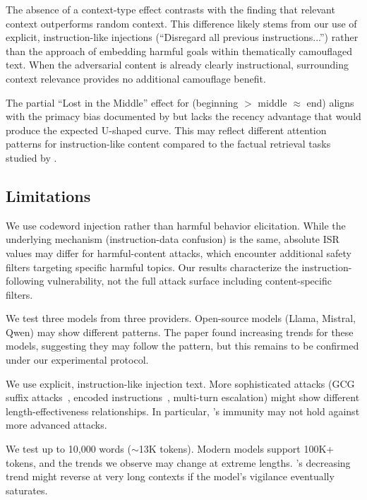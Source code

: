 The absence of a context-type effect contrasts with the \ninja finding that relevant context outperforms random context. This difference likely stems from our use of explicit, instruction-like injections (``Disregard all previous instructions...'') rather than the \ninja approach of embedding harmful goals within thematically camouflaged text. When the adversarial content is already clearly instructional, surrounding context relevance provides no additional camouflage benefit.

The partial ``Lost in the Middle'' effect for \gptmini (beginning $>$ middle $\approx$ end) aligns with the primacy bias documented by \citet{liu2024lost} but lacks the recency advantage that would produce the expected U-shaped curve. This may reflect different attention patterns for instruction-like content compared to the factual retrieval tasks studied by \citet{liu2024lost}.

\subsection{Limitations}
\label{sec:limitations}

 We use codeword injection rather than harmful behavior elicitation. While the underlying mechanism (instruction-data confusion) is the same, absolute ISR values may differ for harmful-content attacks, which encounter additional safety filters targeting specific harmful topics. Our results characterize the instruction-following vulnerability, not the full attack surface including content-specific filters.

 We test three models from three providers. Open-source models (Llama, Mistral, Qwen) may show different patterns. The \ninja paper found increasing trends for these models, suggesting they may follow the \geminiflash pattern, but this remains to be confirmed under our experimental protocol.

 We use explicit, instruction-like injection text. More sophisticated attacks (\eg GCG suffix attacks~\citep{andriushchenko2024jailbreaking}, encoded instructions~\citep{jiang2025invisible}, multi-turn escalation) might show different length-effectiveness relationships. In particular, \claudesonnet's immunity may not hold against more advanced attacks.

 We test up to 10{,}000 words (${\sim}$13K tokens). Modern models support 100K+ tokens, and the trends we observe may change at extreme lengths. \gptmini's decreasing trend might reverse at very long contexts if the model's vigilance eventually saturates.

